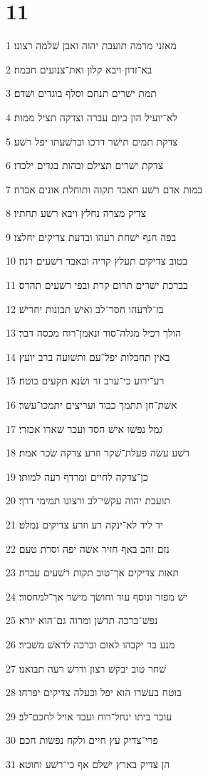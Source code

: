 \chapter{11}

\par 1 מאזני מרמה תועבת יהוה ואבן שׁלמה רצונו׃
\par 2 בא־זדון ויבא קלון ואת־צנועים חכמה׃
\par 3 תמת ישׁרים תנחם וסלף בוגדים ושׁדם׃
\par 4 לא־יועיל הון ביום עברה וצדקה תציל ממות׃
\par 5 צדקת תמים תישׁר דרכו וברשׁעתו יפל רשׁע׃
\par 6 צדקת ישׁרים תצילם ובהות בגדים ילכדו׃
\par 7 במות אדם רשׁע תאבד תקוה ותוחלת אונים אבדה׃
\par 8 צדיק מצרה נחלץ ויבא רשׁע תחתיו׃
\par 9 בפה חנף ישׁחת רעהו ובדעת צדיקים יחלצו׃
\par 10 בטוב צדיקים תעלץ קריה ובאבד רשׁעים רנה׃
\par 11 בברכת ישׁרים תרום קרת ובפי רשׁעים תהרס׃
\par 12 בז־לרעהו חסר־לב ואישׁ תבונות יחרישׁ׃
\par 13 הולך רכיל מגלה־סוד ונאמן־רוח מכסה דבר׃
\par 14 באין תחבלות יפל־עם ותשׁועה ברב יועץ׃
\par 15 רע־ירוע כי־ערב זר ושׂנא תקעים בוטח׃
\par 16 אשׁת־חן תתמך כבוד ועריצים יתמכו־עשׁר׃
\par 17 גמל נפשׁו אישׁ חסד ועכר שׁארו אכזרי׃
\par 18 רשׁע עשׂה פעלת־שׁקר וזרע צדקה שׂכר אמת׃
\par 19 כן־צדקה לחיים ומרדף רעה למותו׃
\par 20 תועבת יהוה עקשׁי־לב ורצונו תמימי דרך׃
\par 21 יד ליד לא־ינקה רע וזרע צדיקים נמלט׃
\par 22 נזם זהב באף חזיר אשׁה יפה וסרת טעם׃
\par 23 תאות צדיקים אך־טוב תקות רשׁעים עברה׃
\par 24 ישׁ מפזר ונוסף עוד וחושׂך מישׁר אך־למחסור׃
\par 25 נפשׁ־ברכה תדשׁן ומרוה גם־הוא יורא׃
\par 26 מנע בר יקבהו לאום וברכה לראשׁ משׁביר׃
\par 27 שׁחר טוב יבקשׁ רצון ודרשׁ רעה תבואנו׃
\par 28 בוטח בעשׁרו הוא יפל וכעלה צדיקים יפרחו׃
\par 29 עוכר ביתו ינחל־רוח ועבד אויל לחכם־לב׃
\par 30 פרי־צדיק עץ חיים ולקח נפשׂות חכם׃
\par 31 הן צדיק בארץ ישׁלם אף כי־רשׁע וחוטא׃


